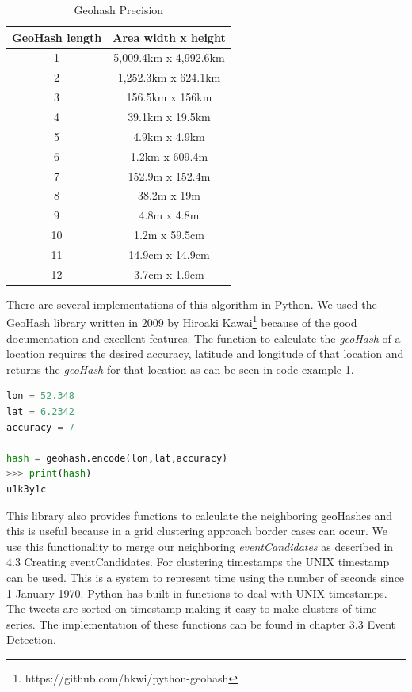 \documentclass[
10pt, %
a4paper, %
oneside, %
headinclude,footinclude, %
BCOR5mm, %
]{scrartcl}
\begin{document}
\begin{table}[h]
\caption[Geohash Precision]{Geohash Precision}
\begin{tabular}{|c|c|}
\hline
GeoHash length & Area width x height   \\ \hline
1              & 5,009.4km x 4,992.6km \\ \hline
2              & 1,252.3km x 624.1km   \\ \hline
3              & 156.5km x 156km       \\ \hline
4              & 39.1km x 19.5km       \\ \hline
5              & 4.9km x 4.9km         \\ \hline
6              & 1.2km x 609.4m        \\ \hline
7              & 152.9m x 152.4m       \\ \hline
8              & 38.2m x 19m           \\ \hline
9              & 4.8m x 4.8m           \\ \hline
10             & 1.2m x 59.5cm         \\ \hline
11             & 14.9cm x 14.9cm       \\ \hline
12             & 3.7cm x 1.9cm         \\ \hline
\end{tabular}
\end{table}
\newpage
\noindent There are several implementations of this algorithm in Python. We used the GeoHash library written in 2009 by Hiroaki Kawai\footnote{https://github.com/hkwi/python-geohash} because of the good documentation and excellent features. The function to calculate the \textit{geoHash} of a location requires the desired accuracy, latitude and longitude of that location and returns the \textit{geoHash} for that location as can be seen in code example 1. \vl

\begin{lstlisting}[language=Python, caption=Example of geoHash encoding]
lon = 52.348
lat = 6.2342
accuracy = 7

hash = geohash.encode(lon,lat,accuracy)
>>> print(hash)
u1k3y1c
\end{lstlisting}
This library also provides functions to calculate the neighboring geoHashes and this is useful because in a grid clustering approach border cases can occur.  We use this functionality to merge our neighboring \textit{eventCandidates} as described in 4.3 Creating eventCandidates. \vl
For clustering timestamps the UNIX timestamp can be used. This is a system to represent time using the number of seconds since 1 January 1970. Python has built-in functions to deal with UNIX timestamps. The tweets are sorted on timestamp making it easy to make clusters of time series. The implementation of these functions can be found in chapter 3.3 Event Detection.
\end{document}
